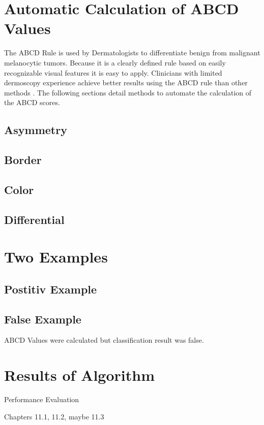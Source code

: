 \section{Automatic Calculation of ABCD Values}

The ABCD Rule is used by Dermatologists to differentiate benign from malignant melanocytic tumors. Because it is a clearly defined rule based on easily recognizable visual features it is easy to apply. Clinicians with limited dermoscopy experience achieve better results using the ABCD rule than other methods \cite{Weigert_2012}. The following sections detail methods to automate the calculation of the ABCD scores.

\subsection{Asymmetry}

\subsection{Border}

\subsection{Color}

\subsection{Differential}

\section{Two Examples}
\subsection{Postitiv Example}

\subsection{False Example}

ABCD Values were calculated but classification result was false.

\section{Results of Algorithm}

Performance Evaluation

Chapters 11.1, 11.2, maybe 11.3